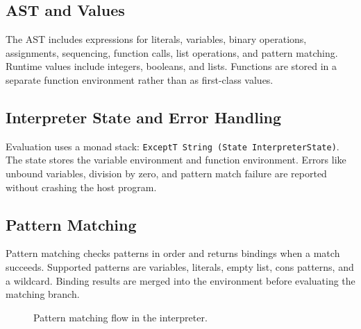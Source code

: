 \documentclass[11pt]{article}
\begin{document}
\subsection{AST and Values}
The AST includes expressions for literals, variables, binary operations, assignments, sequencing, function calls, list operations, and pattern matching. Runtime values include integers, booleans, and lists. Functions are stored in a separate function environment rather than as first-class values.

\subsection{Interpreter State and Error Handling}
Evaluation uses a monad stack: \texttt{ExceptT String (State InterpreterState)}. The state stores the variable environment and function environment. Errors like unbound variables, division by zero, and pattern match failure are reported without crashing the host program.

\subsection{Pattern Matching}
Pattern matching checks patterns in order and returns bindings when a match succeeds. Supported patterns are variables, literals, empty list, cons patterns, and a wildcard. Binding results are merged into the environment before evaluating the matching branch.

\begin{figure}[h]
\centering
{}
\caption{Pattern matching flow in the interpreter.}
\label{fig:match}
\end{figure}
\end{document}
